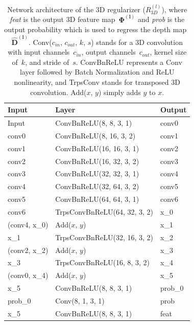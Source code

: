 \begin{table}[t]
    \begin{center}
        \begin{threeparttable}
            \begin{tabular}{lll}
            Input &  Layer & Output  \\
            \hline
            Input & ConvBnReLU(8, 8, 3, 1) & conv0  \\
            conv0 & ConvBnReLU(8, 16, 3, 2) & conv1 \\
            conv1 & ConvBnReLU(16, 16, 3, 1) & conv2 \\
            conv2 & ConvBnReLU(16, 32, 3, 2) & conv3 \\
            conv3 & ConvBnReLU(32, 32, 3, 1) & conv4 \\
            conv4 & ConvBnReLU(32, 64, 3, 2) & conv5 \\
            conv5 & ConvBnReLU(64, 64, 3, 1) & conv6 \\
            conv6 & TrpsConvBnReLU(64, 32, 3, 2) & x\_0 \\
            (conv4, x\_0) & Add($x$, $y$) & x\_1 \\
            x\_1 & TrpsConvBnReLU(32, 16, 3, 2) & x\_2 \\
            (conv2, x\_2) & Add($x$, $y$) & x\_3 \\
            x\_3 & TrpsConvBnReLU(16, 8, 3, 2) & x\_4 \\
            (conv0, x\_4) & Add($x$, $y$) & x\_5 \\
            x\_5 & ConvBnReLU(8, 8, 3, 1) & prob\_0  \\
            prob\_0 & Conv(8, 1, 3, 1) & prob  \\
            x\_5 & ConvBnReLU(8, 8, 3, 1) & feat  \\
            \hline
            \end{tabular}
        \end{threeparttable}
    \end{center}
    \caption{Network architecture of the 3D regularizer ($R^{(l)}_{3D}$), where \textit{feat} is the output 3D feature map~$\boldsymbol{\Phi^{(l)}}$ and \textit{prob} is the output probability which is used to regress the depth map~$\boldsymbol{\hat{D}^{(l)}}$. Conv($c_{in}$, $c_{out}$, $k$, $s$) stands for a 3D convolution with input channels~$c_{in}$, output channels~$c_{out}$, kernel size of~$k$, and stride of~$s$. ConvBnReLU represents a Conv layer followed by Batch Normalization and ReLU nonlinearity, and TrpsConv stands for transposed 3D convolution. Add($x$, $y$) simply adds $y$ to $x$.}
    \label{table:arch_reg3D}
    \vspace{4ex}
\end{table}

